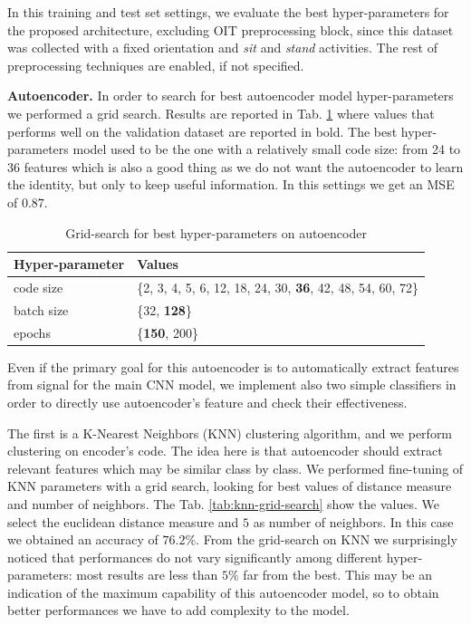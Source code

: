 In this training and test set settings, we evaluate the best
hyper-parameters for the proposed architecture, excluding OIT
preprocessing block, since this dataset was collected with a fixed
orientation and \textit{sit} and \textit{stand} activities. The rest
of preprocessing techniques are enabled, if not specified.

\textbf{Autoencoder.} In order to search for best autoencoder model
hyper-parameters we performed a grid search. Results are reported in
Tab. \ref{tab:ae-hyperparams} where values that performs well on the
validation dataset are reported in bold. The best hyper-parameters
model used to be the one with a relatively small code size: from 24 to
36 features which is also a good thing as we do not want the
autoencoder to learn the identity, but only to keep useful
information. In this settings we get an MSE of $0.87$.

\begin{table}[t]
  \centering
  \begin{tabular}{lp{4cm}}
    \hline
    Hyper-parameter & Values \\
    \hline
    code size & \{2, 3, 4, 5, 6, 12, 18, 24, 30, \textbf{36}, 42, 48, 54, 60, 72\} \\
    batch size & \{32, \textbf{128}\} \\
    epochs & \{\textbf{150}, 200\} \\
    \hline
  \end{tabular}
  \caption{Grid-search for best hyper-parameters on autoencoder}
  \label{tab:ae-hyperparams}
\end{table}

Even if the primary goal for this autoencoder is to automatically
extract features from signal for the main CNN model, we implement also
two simple classifiers in order to directly use autoencoder's feature
and check their effectiveness.

The first is a K-Nearest Neighbors (KNN) clustering algorithm, and we
perform clustering on encoder's code. The idea here is that
autoencoder should extract relevant features which may be similar
class by class. We performed fine-tuning of KNN parameters with a grid
search, looking for best values of distance measure and number of
neighbors. The Tab. \ref{tab:knn-grid-search} show the values.  We
select the euclidean distance measure and $5$ as number of neighbors.
In this case we obtained an accuracy of $76.2$\%.  From the
grid-search on KNN we surprisingly noticed that performances do not
vary significantly among different hyper-parameters: most results are
less than $5$\% far from the best. This may be an indication of the
maximum capability of this autoencoder model, so to obtain better
performances we have to add complexity to the model.

